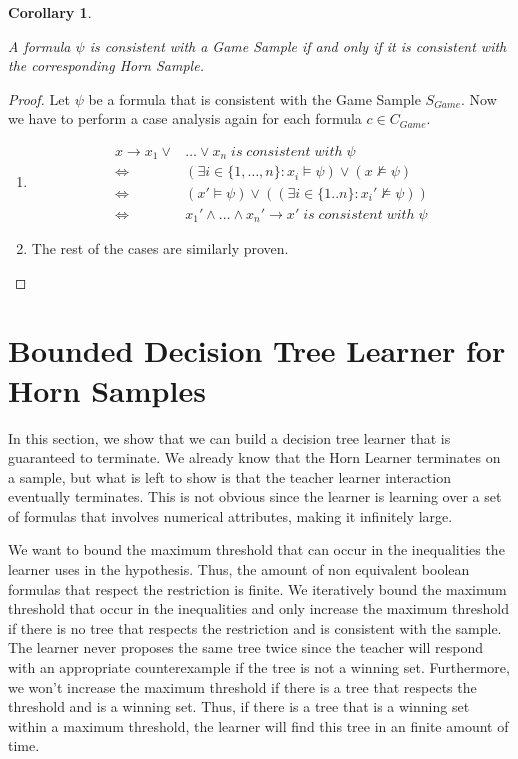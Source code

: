 \documentclass[10pt,a4paper]{article}
\newtheorem{cor}[thm]{Corollary}
\theoremstyle{plain}
\theoremstyle{definition}
\begin{document}
\begin{cor} \label{Korollar}

A formula $\psi$ is consistent with a Game Sample if and only if it is consistent with the corresponding Horn Sample.
\end{cor}
\begin{proof}
Let $\psi $ be a formula that is consistent with the Game Sample $S_{Game}$. Now we have to perform a case analysis again for each formula $c \in C_{Game}$.
\begin{enumerate}
\item
\begin{equation*}
\begin{split}
x \to x_1 \vee &\dots \vee x_n \; is \; consistent \; with \; \psi \\
\iff &(\exists i \in \{1,\dots,n\}: x_i \vDash \psi) \vee (x \nvDash \psi) \\
\iff &(x' \vDash \psi) \vee ((\exists i\in \{1..n\}: x_i' \nvDash \psi)) \\
\iff &x_1' \wedge \dots \wedge x_n' \to x' \; is \; consistent \; with \; \psi 
\end{split}
\end{equation*}
\item The rest of the cases are similarly proven.
\end{enumerate}
\end{proof}

\section{Bounded Decision Tree Learner for Horn Samples}

In this section, we show that we can build a decision tree learner that is guaranteed to terminate. We already know that the Horn Learner terminates on a sample\cite{d2017horn}, but what is left to show is that the teacher learner interaction eventually terminates. This is not obvious since the learner is learning over a set of formulas that involves numerical attributes, making it infinitely large.

We want to bound the maximum threshold that can occur in the inequalities the learner uses in the hypothesis. Thus, the amount of non equivalent boolean formulas that respect the restriction is finite. We iteratively bound the maximum threshold that occur in the inequalities and only increase the maximum threshold if there is no tree that respects the restriction and is consistent with the sample. The learner never proposes the same tree twice since the teacher will respond with an appropriate counterexample if the tree  is not a winning set. Furthermore, we won't increase the maximum threshold if there is a tree that respects the threshold and is a winning set. Thus, if there is a tree that is a winning set within a maximum threshold, the learner will find this tree in an finite amount of time.
\end{document}
